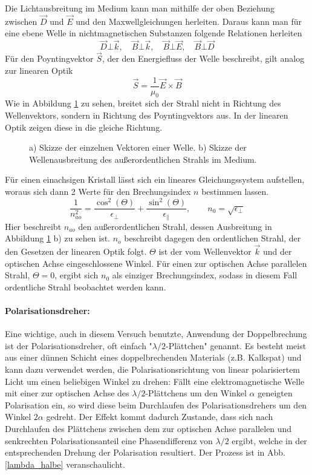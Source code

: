 Die Lichtausbreitung im Medium kann man mithilfe der oben Beziehung zwischen 
$\vec{D}$ und $\vec{E}$ und den Maxwellgleichungen herleiten. Daraus kann man 
für eine ebene Welle in nichtmagnetischen Substanzen folgende Relationen herleiten
\[
    \vec{D} \bot \vec{k}, \quad \vec{B} \bot \vec{k}, \quad
    \vec{B} \bot \vec{E}, \quad \vec{B} \bot \vec{D}
\]
Für den Poyntingvektor $\vec{S}$, der den Energiefluss der Welle beschreibt, 
gilt analog zur linearen Optik
\[
    \vec{S} = \frac{1}{\mu_0} \vec{E} \times \vec{B}
\]
Wie in Abbildung \ref{abb:doppel} zu sehen, breitet sich der Strahl nicht in
Richtung des Wellenvektors, sondern in Richtung des Poyntingvektors aus. In der
linearen Optik zeigen diese in die gleiche Richtung.
\begin{figure}[h]
  \centering
  
    \caption{a) Skizze der einzelnen Vektoren einer Welle. b) Skizze der 
             Wellenausbreitung des außerordentlichen Strahls im Medium.}
  \label{abb:doppel}
\end{figure}
Für einen einachsigen Kristall lässt sich ein lineares Gleichungssystem 
aufstellen, woraus sich dann 2 Werte für den Brechungsindex $n$ bestimmen lassen.
\[
    \frac{1}{n_{ao}^2} = \frac{\cos^2(\Theta)}{\epsilon_{\bot}} +
                         \frac{\sin^2(\Theta)}{\epsilon_{\parallel}},
    \qquad n_0 = \sqrt{\epsilon_{\bot}}
\]
Hier beschreibt $n_{ao}$ den außerordentlichen Strahl, dessen Ausbreitung in
Abbildung \ref{abb:doppel} b) zu sehen ist. $n_o$ beschreibt dagegen den 
ordentlichen Strahl, der den Gesetzen der linearen Optik folgt. 
$\Theta$ ist der vom Wellenvektor $\vec{k}$ und der optischen Achse 
eingeschlossene Winkel. Für einen zur optischen Achse parallelen Strahl, 
$\Theta=0$, ergibt sich $n_0$ als einziger Brechungsindex, sodass in diesem Fall
ordentliche Strahl beobachtet werden kann.

\paragraph*{Polarisationsdreher:} Eine wichtige, auch in diesem Versuch benutzte, Anwendung	der Doppelbrechung ist der Polarisationsdreher, oft einfach "$\lambda/2$-Plättchen"{} genannt. Es besteht meist aus einer dünnen Schicht eines doppelbrechenden Materials (z.B. Kalkspat) und kann dazu verwendet werden, die Polarisationsrichtung von linear polarisiertem Licht um einen beliebigen Winkel zu drehen: Fällt eine elektromagnetische Welle mit einer zur optischen Achse des $\lambda/2$-Plättchens um den Winkel $\alpha$ geneigten Polarisation ein, so wird diese beim Durchlaufen des Polarisationsdrehers um den Winkel $2\alpha$ gedreht. Der Effekt kommt dadurch Zustande, dass sich nach Durchlaufen des Plättchens zwischen dem zur optischen Achse parallelen und senkrechten Polarisationsanteil eine Phasendifferenz von $\lambda/2$ ergibt, welche in der entsprechenden Drehung der Polarisation resultiert. Der Prozess ist in Abb. \ref{lambda_halbe} veranschaulicht.

